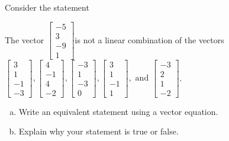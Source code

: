 
\begin{exerciseStatement}


Consider the statement 
\begin{center}\begin{minipage}{0.8\textwidth}
 The vector \( \left[\begin{array}{c}
-5 \\
3 \\
-9 \\
1
\end{array}\right] \)is not a linear combination of the vectors \( \left[\begin{array}{c}
3 \\
1 \\
-1 \\
-3
\end{array}\right] , \left[\begin{array}{c}
4 \\
-1 \\
4 \\
-2
\end{array}\right] , \left[\begin{array}{c}
-3 \\
1 \\
-3 \\
0
\end{array}\right] , \left[\begin{array}{c}
3 \\
1 \\
-1 \\
1
\end{array}\right] , \text{ and } \left[\begin{array}{c}
-3 \\
2 \\
1 \\
-2
\end{array}\right] \). 
\end{minipage}\end{center}
    


\begin{enumerate}[(a)]
\item  Write an equivalent statement using a vector equation.
\item  Explain why your statement is true or false.
\end{enumerate}
    
\end{exerciseStatement}
    
